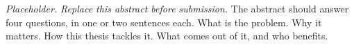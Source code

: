\cleartoleftpageNotMainSec

\textit{Placeholder. Replace this abstract before submission.}
The abstract should answer four questions, in one or two sentences each.
What is the problem.
Why it matters.
How this thesis tackles it.
What comes out of it, and who benefits.
